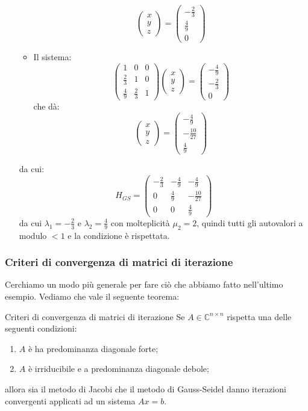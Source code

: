 \documentclass[a4paper,11pt]{article}
\begin{document}
\begin{itemize}
\begin{itemize}
$$\begin{pmatrix}
	x \\ y \\ z
\end{pmatrix} = 
\begin{pmatrix}
	-\frac{2}{3} \\ \frac{4}{9} \\ 0
\end{pmatrix}
$$
	\item Il sistema:
$$
\begin{pmatrix}
	1 & 0 & 0 \\ 
	\frac{2}{3} & 1 & 0 \\ 
	\frac{4}{9} & \frac{2}{3} & 1
\end{pmatrix}
\begin{pmatrix}
	x \\ y \\ z
\end{pmatrix} =
\begin{pmatrix}
	-\frac{4}{9} \\ -\frac{2}{3} \\ 0
\end{pmatrix}
$$
che dà:
$$
\begin{pmatrix}
	x \\ y \\ z
\end{pmatrix} = 
\begin{pmatrix}
	-\frac{4}{9} \\ -\frac{10}{27} \\ \frac{4}{9}
\end{pmatrix}
$$
\end{itemize}
da cui:
$$
H_{GS} = \begin{pmatrix}
	-\frac{2}{3} & -\frac{4}{9} & -\frac{4}{9} \\ 
	0 & \frac{4}{9} & -\frac{10}{27} \\ 
	0 & 0 & \frac{4}{9}
\end{pmatrix}
$$
da cui $\lambda_1 = -\frac{2}{3}$ e $\lambda_2 = \frac{4}{9}$ con molteplicità $\mu_2 = 2$, quindi tutti gli autovalori a modulo $< 1$ e la condizione è rispettata.
\end{itemize}

\subsubsection{Criteri di convergenza di matrici di iterazione}
Cerchiamo un modo più generale per fare ciò che abbiamo fatto nell'ultimo esempio.
Vediamo che vale il seguente teorema:
\begin{theorem}{Criteri di convergenza di matrici di iterazione}
	Se $A \in \mathbb{C}^{n \times n}$ rispetta una delle seguenti condizioni:
	\begin{enumerate}
		\item $A$ è ha predominanza diagonale forte;
		\item $A$ è irriducibile e a predominanza diagonale debole;
	\end{enumerate}
	allora sia il metodo di Jacobi che il metodo di Gauss-Seidel danno iterazioni convergenti applicati ad un sistema $Ax = b$. 
\end{theorem}
\end{document}
